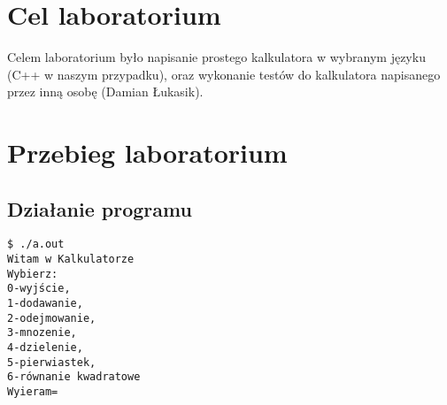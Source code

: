 \documentclass{article}
\begin{document}

\newpage
\section{Cel laboratorium}
Celem laboratorium było napisanie prostego kalkulatora w wybranym języku (C++ w naszym przypadku), oraz wykonanie testów do kalkulatora napisanego przez inną osobę (Damian Łukasik).

\section{Przebieg laboratorium}
\subsection{Działanie programu}

\begin{lstlisting}
$ ./a.out
Witam w Kalkulatorze
Wybierz:
0-wyjście,
1-dodawanie,
2-odejmowanie,
3-mnozenie,
4-dzielenie,
5-pierwiastek,
6-równanie kwadratowe
Wyieram=

\end{lstlisting}
\end{document}
